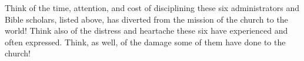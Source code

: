 Think of the time, attention, and cost of disciplining these six
administrators and Bible scholars, listed above, has diverted from the
mission of the church to the world! Think also of the distress and heartache
these six have experienced and often expressed. Think, as well, of the
damage some of them have done to the church! 
